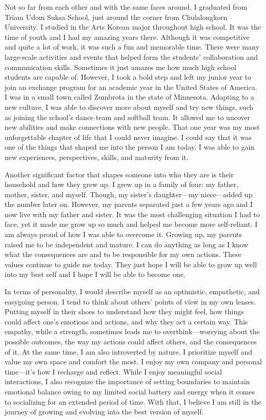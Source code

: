 \documentclass[11pt]{book}
\begin{document}
Not so far from each other and with the same faces around, I graduated from Triam Udom Suksa School, just around the corner from Chulalongkorn University. I studied in the Arts Korean major throughout high school. It was the time of youth and I had my amazing years there. Although it was competitive and quite a lot of work, it was such a fun and memorable time. There were many large-scale activities and events that helped form the students' collaboration and communication skills. Sometimes it just amazes me how much high school students are capable of. However, I took a bold step and left my junior year to join an exchange program for an academic year in the United States of America. I was in a small town called Zumbrota in the state of Minnesota. Adapting to a new culture, I was able to discover more about myself and try new things, such as joining the school's dance team and softball team. It allowed me to uncover new abilities and make connections with new people. That one year was my most unforgettable chapter of life that I could never imagine. I could say that it was one of the things that shaped me into the person I am today. I was able to gain new experiences, perspectives, skills, and maturity from it.

Another significant factor that shapes someone into who they are is their household and how they grew up. I grew up in a family of four: my father, mother, sister, and myself. Though, my sister’s daughter—my niece—added up the number later on. However, my parents separated just a few years ago and I now live with my father and sister. It was the most challenging situation I had to face, yet it made me grow up so much and helped me become more self-reliant. I am always proud of how I was able to overcome it. Growing up, my parents raised me to be independent and mature. I can do anything as long as I know what the consequences are and to be responsible for my own actions. These values continue to guide me today. They just hope I will be able to grow up well into my best self and I hope I will be able to become one.

In terms of personality, I would describe myself as an optimistic, empathetic, and easygoing person. I tend to think about others' points of view in my own lenses. Putting myself in their shoes to understand how they might feel, how things could affect one’s emotions and actions, and why they act a certain way. This empathy, while a strength, sometimes leads me to overthink—worrying about the possible outcomes, the way my actions could affect others, and the consequences of it. At the same time, I am also introverted by nature. I prioritize myself and value my own space and comfort the most. I enjoy my own company and personal time—it’s how I recharge and reflect. While I enjoy meaningful social interactions, I also recognize the importance of setting boundaries to maintain emotional balance owing to my limited social battery and energy when it comes to socializing for an extended period of time. With that, I believe I am still in the journey of growing and evolving into the best version of myself.
\end{document}
